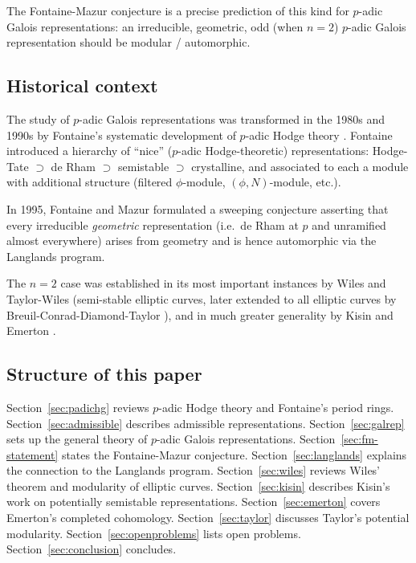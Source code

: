 \documentclass[12pt,a4paper]{amsart}
\theoremstyle{definition}
\theoremstyle{remark}
\begin{document}
The Fontaine-Mazur conjecture \cite{FM1995} is a precise prediction of this kind for
$p$-adic Galois representations: an irreducible, geometric, odd (when $n=2$)
$p$-adic Galois representation should be modular / automorphic.

\subsection{Historical context}
The study of $p$-adic Galois representations was transformed in the 1980s and 1990s by
Fontaine's systematic development of $p$-adic Hodge theory
\cite{Fontaine1979,Fontaine1982,Fontaine1994}.
Fontaine introduced a hierarchy of ``nice'' ($p$-adic Hodge-theoretic) representations:
Hodge-Tate $\supset$ de Rham $\supset$ semistable $\supset$ crystalline,
and associated to each a module with additional structure (filtered $\phi$-module,
$(\phi,N)$-module, etc.).

In 1995, Fontaine and Mazur \cite{FM1995} formulated a sweeping conjecture asserting that
every irreducible \emph{geometric} representation (i.e.\ de Rham at $p$ and unramified
almost everywhere) arises from geometry and is hence automorphic via the Langlands program.

The $n=2$ case was established in its most important instances by Wiles \cite{Wiles1995}
and Taylor-Wiles \cite{TW1995} (semi-stable elliptic curves, later extended to all
elliptic curves by Breuil-Conrad-Diamond-Taylor \cite{BCDT2001}),
and in much greater generality by Kisin \cite{Kisin2009} and Emerton \cite{Emerton2010}.

\subsection{Structure of this paper}
Section~\ref{sec:padichg} reviews $p$-adic Hodge theory and Fontaine's period rings.
Section~\ref{sec:admissible} describes admissible representations.
Section~\ref{sec:galrep} sets up the general theory of $p$-adic Galois representations.
Section~\ref{sec:fm-statement} states the Fontaine-Mazur conjecture.
Section~\ref{sec:langlands} explains the connection to the Langlands program.
Section~\ref{sec:wiles} reviews Wiles' theorem and modularity of elliptic curves.
Section~\ref{sec:kisin} describes Kisin's work on potentially semistable representations.
Section~\ref{sec:emerton} covers Emerton's completed cohomology.
Section~\ref{sec:taylor} discusses Taylor's potential modularity.
Section~\ref{sec:openproblems} lists open problems.
Section~\ref{sec:conclusion} concludes.
\end{document}
